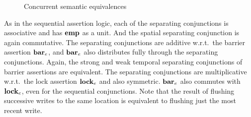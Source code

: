 \documentclass[11pt]{report}         %
\begin{document}
\begin{figure}[ht]
      \centering
      \caption{\label{fig:equivalences}Concurrent semantic equivalences}
\end{figure}

As in the sequential assertion logic, each of the separating conjunctions is associative and has $\mathbf{emp}$ as a unit. And the spatial separating conjunction is again commutative. The separating conjunctions are additive w.r.t.\ the barrier assertion $\mathbf{bar}_{e}$, and $\mathbf{bar}_{e}$ also distributes fully through the separating conjunctions. Again, the strong and weak temporal separating conjunctions of barrier assertions are equivalent. The separating conjunctions are multiplicative w.r.t.\ the lock assertion $\mathbf{lock}_{e}$ and also symmetric. $\mathbf{bar}_{e}$ also commutes with $\mathbf{lock}_{e}$, even for the sequential conjunctions. Note that the result of flushing successive writes to the same location is equivalent to flushing just the most recent write. 
\end{document}
